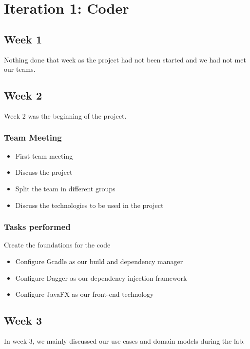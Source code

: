\documentclass[12pt]{article}
\begin{document}
\maketitle

\section{Iteration 1: Coder}
\subsection{Week 1}
Nothing done that week as the project had not been started and we had not met our teams.

\subsection{Week 2}
Week 2 was the beginning of the project.

\subsubsection{Team Meeting}
\begin{itemize}
    \item First team meeting
    \item Discuss the project
    \item Split the team in different groups
    \item Discuss the technologies to be used in the project
\end{itemize}

\subsubsection{Tasks performed}
\item Create the foundations for the code
\begin{itemize}
    \item Configure Gradle as our build and dependency manager
    \item Configure Dagger as our dependency injection framework
    \item Configure JavaFX as our front-end technology
\end{itemize}

\subsection{Week 3}
In week 3, we mainly discussed our use cases and domain models during the lab.
\end{document}
